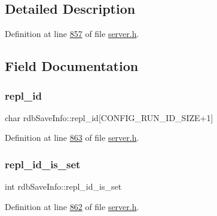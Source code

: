 \subsection{Detailed Description}


Definition at line \hyperlink{server_8h_source_l00857}{857} of file \hyperlink{server_8h_source}{server.\+h}.



\subsection{Field Documentation}
\mbox{\label{structrdbSaveInfo_a7783645ebfcf5df133bc4b91ba725243}} 
\subsubsection{\texorpdfstring{repl\+\_\+id}{repl\_id}}
{\footnotesize\ttfamily char rdb\+Save\+Info\+::repl\+\_\+id\mbox{[}C\+O\+N\+F\+I\+G\+\_\+\+R\+U\+N\+\_\+\+I\+D\+\_\+\+S\+I\+ZE+1\mbox{]}}



Definition at line \hyperlink{server_8h_source_l00863}{863} of file \hyperlink{server_8h_source}{server.\+h}.

\mbox{\label{structrdbSaveInfo_a15395db915e510ef8f43e59c0fa5ad5b}} 
\subsubsection{\texorpdfstring{repl\+\_\+id\+\_\+is\+\_\+set}{repl\_id\_is\_set}}
{\footnotesize\ttfamily int rdb\+Save\+Info\+::repl\+\_\+id\+\_\+is\+\_\+set}



Definition at line \hyperlink{server_8h_source_l00862}{862} of file \hyperlink{server_8h_source}{server.\+h}.

\mbox{\label{structrdbSaveInfo_a60d50fcc78cb0466590f7783161c52d2}} 
